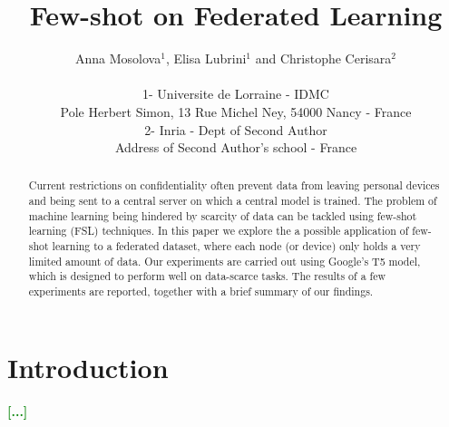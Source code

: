 \documentclass{esannV2}
\begin{document}
\title{Few-shot on Federated Learning}


\author{Anna Mosolova$^1$, Elisa Lubrini$^1$ and Christophe Cerisara$^2$ 

\vspace{.3cm}\\
%
1- Universite de Lorraine - IDMC \\
Pole Herbert Simon, 13 Rue Michel Ney, 54000 Nancy - France
%
\vspace{.1cm}\\
2- Inria - Dept of Second Author \\
Address of Second Author's school - France\\
}

\maketitle

\begin{abstract}
Current restrictions on confidentiality often prevent data from leaving personal devices and being sent to a central server on which a central model is trained. The problem of machine learning being hindered by scarcity of data can be tackled using few-shot learning (FSL) techniques. In this paper we explore the a possible application of few-shot learning to a federated dataset, where each node (or device) only holds a very limited amount of data. Our experiments are carried out using Google's T5 model, which is designed to perform well on data-scarce tasks. The results of a few experiments are reported, together with a brief summary of our findings.
\end{abstract}

\section{Introduction}
\textcolor{green}{\textbf{[...]}}
\end{document}
